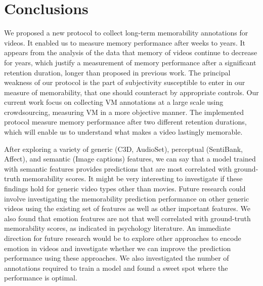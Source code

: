 \documentclass[sigconf]{acmart}
\begin{document}
\section{Conclusions}
We proposed a new protocol to collect long-term memorability annotations for videos.
It enabled us to measure memory performance after weeks to years.
It appears from the analysis of the data that memory of videos continue to decrease for years, which justify a measurement of memory performance after a significant retention duration, longer than proposed in previous work.
The principal weakness of our protocol is the part of subjectivity susceptible to enter in our measure of memorability, that one should counteract by appropriate controls.
Our current work focus on collecting VM annotations at a large scale using crowdsourcing, measuring VM in a more objective manner.
The implemented protocol measure memory performance after two different retention durations, which will enable us to understand what makes a video lastingly memorable.

After exploring a variety of generic (C3D, AudioSet), perceptual (SentiBank, Affect), and semantic (Image captions) features, we can say that a model trained with  semantic features provides predictions that are most correlated with ground-truth memorability scores.
It might be very interesting to investigate if these findings hold for generic video types other than movies.
Future research could involve investigating the memorability prediction performance on other generic videos using the existing set of features as well as other important features.
We also found that emotion features are not that well correlated with ground-truth memorability scores, as indicated in psychology literature.
An immediate direction for future research would be to explore other approaches to encode emotion in videos and investigate whether we can improve the prediction performance using these approaches.
We also investigated the number of annotations required to train a model and found a sweet spot where the performance is optimal.

\addtolength{\textheight}{-12cm}   %
\end{document}

